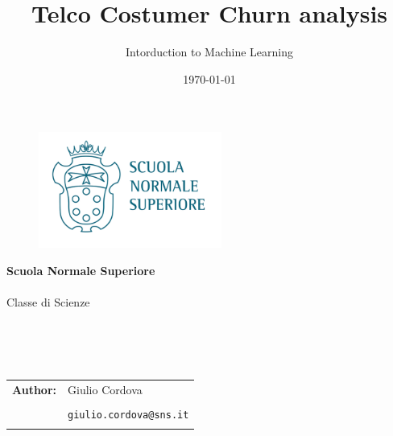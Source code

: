 \documentclass[a4paper,11pt]{article}
\title{Telco Costumer Churn analysis}
\author{Intorduction to Machine Learning}
\date{\today}
\begin{document}
        \thispagestyle{empty}
        \begin{figure}
            \includegraphics[width=60mm,right]{./1 logo.png}
        \end{figure}
        \vspace*{-38mm}\hspace{-6mm}\textbf{\textcolor{blunipi}{\large{Scuola Normale Superiore}}}\\\\
        \hspace{-2mm}\textcolor{blunipi}{\large{Classe di Scienze}}
        
        \vspace{15mm}
        \begin{center}
            \textcolor{blunipi}{\huge{\textbf{\thetitle}}}\\\vspace*{7mm}
        \textcolor{blunipi}{\theauthor}\\\vspace*{10mm}
            \textcolor{blunipi}{\thedate}\\\vspace*{10mm}
            
            \begin{tabular}{rl}
                \textbf{Author:} 
                & Giulio Cordova \\ 
                & \\
                & \texttt{giulio.cordova@sns.it}\\\\
                
                
            \end{tabular}
            \vspace*{5mm}
\end{center}
\tableofcontents
    \restoregeometry
    \setcounter{page}{1}
\pagestyle{plain}
\end{document}
